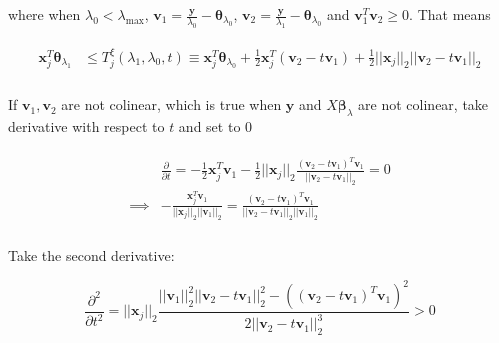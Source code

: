 where when $\lambda_0<\lambda_{\max}$, $\boldsymbol v_1=\frac{\boldsymbol y}{\lambda_0}-\boldsymbol\theta_{\lambda_0}$, $\boldsymbol v_2=\frac{\boldsymbol y}{\lambda_1}-\boldsymbol\theta_{\lambda_0}$ and $\boldsymbol v_1^T\boldsymbol v_2\geq0$. That means

\begin{gather}
    \label{eq:edppobj}
    \begin{aligned}
        \boldsymbol x_j^T\boldsymbol\theta_{\lambda_1}&\leq T^\xi_j(\lambda_1,\lambda_0,t)\equiv \boldsymbol x_j^T\boldsymbol\theta_{\lambda_0}+\frac{1}{2}\boldsymbol x_j^T(\boldsymbol v_2-t\boldsymbol v_1)+\frac{1}{2}||\boldsymbol x_j||_2||\boldsymbol v_2-t\boldsymbol v_1||_2\\
    \end{aligned}
\end{gather}

If $\boldsymbol v_1,\boldsymbol v_2$ are not colinear, which is true when $\boldsymbol y$ and $X\boldsymbol\beta_\lambda$ are not colinear, take derivative with respect to $t$ and set to 0

\begin{gather}
    \label{eq:edppdt}
    \begin{aligned}
        &\frac{\partial}{\partial t}=-\frac{1}{2}\boldsymbol x_j^T\boldsymbol v_1-\frac{1}{2}||\boldsymbol x_j||_2\frac{(\boldsymbol v_2-t\boldsymbol v_1)^T\boldsymbol v_1}{||\boldsymbol v_2-t\boldsymbol v_1||_2}=0\\
        \implies & -\frac{\boldsymbol x_j^T\boldsymbol v_1}{||\boldsymbol x_j||_2||\boldsymbol v_1||_2}=\frac{(\boldsymbol v_2-t\boldsymbol v_1)^T\boldsymbol v_1}{||\boldsymbol v_2-t\boldsymbol v_1||_2||\boldsymbol v_1||_2}\\
    \end{aligned}
\end{gather}

Take the second derivative:

\begin{equation}
    \frac{\partial^2}{\partial t^2}=||\boldsymbol x_j||_2\frac{||\boldsymbol v_1||^2_2||\boldsymbol v_2-t\boldsymbol v_1||^2_2-\left((\boldsymbol v_2-t\boldsymbol v_1)^T\boldsymbol v_1\right)^2}{2||\boldsymbol v_2-t\boldsymbol v_1||^3_2}>0
\end{equation}

